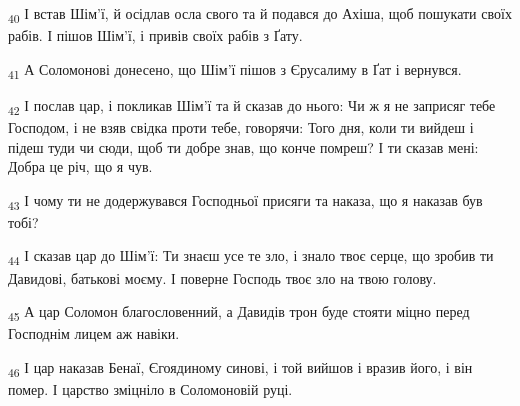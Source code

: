 \begin{tcolorbox}
\textsubscript{40} І встав Шім'ї, й осідлав осла свого та й подався до Ахіша, щоб пошукати своїх рабів. І пішов Шім'ї, і привів своїх рабів з Ґату.
\end{tcolorbox}
\begin{tcolorbox}
\textsubscript{41} А Соломонові донесено, що Шім'ї пішов з Єрусалиму в Ґат і вернувся.
\end{tcolorbox}
\begin{tcolorbox}
\textsubscript{42} І послав цар, і покликав Шім'ї та й сказав до нього: Чи ж я не заприсяг тебе Господом, і не взяв свідка проти тебе, говорячи: Того дня, коли ти вийдеш і підеш туди чи сюди, щоб ти добре знав, що конче помреш? І ти сказав мені: Добра це річ, що я чув.
\end{tcolorbox}
\begin{tcolorbox}
\textsubscript{43} І чому ти не додержувався Господньої присяги та наказа, що я наказав був тобі?
\end{tcolorbox}
\begin{tcolorbox}
\textsubscript{44} І сказав цар до Шім'ї: Ти знаєш усе те зло, і знало твоє серце, що зробив ти Давидові, батькові моєму. І поверне Господь твоє зло на твою голову.
\end{tcolorbox}
\begin{tcolorbox}
\textsubscript{45} А цар Соломон благословенний, а Давидів трон буде стояти міцно перед Господнім лицем аж навіки.
\end{tcolorbox}
\begin{tcolorbox}
\textsubscript{46} І цар наказав Бенаї, Єгоядиному синові, і той вийшов і вразив його, і він помер. І царство зміцніло в Соломоновій руці.
\end{tcolorbox}
